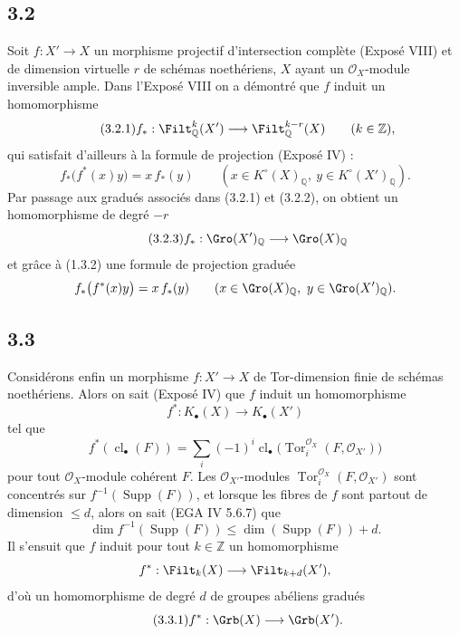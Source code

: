 \documentclass[11pt]{article}
\newcommand{\cl}{\operatorname{cl}}
\newcommand{\Tor}{\operatorname{Tor}}
\providecommand{\Tor}{\operatorname{Tor}}
\providecommand{\Supp}{\operatorname{Supp}}
\begin{document}
\subsection*{3.2}
Soit \(f:X'\to X\) un morphisme projectif d'intersection complète (Exposé VIII) et de dimension virtuelle \(r\) de schémas noethériens, \(X\) ayant un \(\mathcal O_X\)-module inversible ample. Dans l'Exposé VIII on a démontré que \(f\) induit un homomorphisme
\begin{equation}\tag{3.2.1}
 f_*:\Filt^k_{\mathbb Q}(X')\longrightarrow\Filt^{k-r}_{\mathbb Q}(X)\qquad(k\in\mathbb Z),
\end{equation}
qui satisfait d'ailleurs à la formule de projection (Exposé IV) :
\begin{equation}\tag{3.2.2}
 f_*\bigl(f^*(x)y\bigr)=x\,f_*(y)
 \qquad (x\in K^\circ(X)_{\mathbb Q},\ y\in K^\circ(X')_{\mathbb Q}).
\end{equation}
Par passage aux gradués associés dans (3.2.1) et (3.2.2), on obtient un homomorphisme de degré \(-r\)
\begin{equation}\tag{3.2.3}
 f_*:\Gro(X')_{\mathbb Q}\longrightarrow\Gro(X)_{\mathbb Q}
\end{equation}
et grâce à (1.3.2) une formule de projection graduée
\[
 f_*\bigl(f^*(x)y\bigr)=x\,f_*(y)
 \qquad (x\in\Gro(X)_{\mathbb Q},\ y\in\Gro(X')_{\mathbb Q}).
\]

\subsection*{3.3}
Considérons enfin un morphisme \(f:X'\to X\) de Tor-dimension finie de schémas noethériens. Alors on sait (Exposé IV) que \(f\) induit un homomorphisme
\[
 f^*:K_\bullet(X)\longrightarrow K_\bullet(X')
\]
tel que
\[
 f^*(\cl_\bullet(F))=
 \sum_i(-1)^i\cl_\bullet\bigl(\Tor_i^{\mathcal O_X}(F,\mathcal O_{X'})\bigr)
\]
pour tout \(\mathcal O_X\)-module cohérent \(F\). Les \(\mathcal O_{X'}\)-modules \(\Tor_i^{\mathcal O_X}(F,\mathcal O_{X'})\) sont concentrés sur \(f^{-1}(\Supp(F))\), et lorsque les fibres de \(f\) sont partout de dimension \(\leq d\), alors on sait (EGA IV 5.6.7) que
\[
 \dim f^{-1}(\Supp(F))\leq \dim(\Supp(F))+d.
\]
Il s'ensuit que \(f\) induit pour tout \(k\in\mathbb Z\) un homomorphisme
\[
 f^*:\Filt_k(X)\longrightarrow\Filt_{k+d}(X'),
\]
d'où un homomorphisme de degré \(d\) de groupes abéliens gradués
\begin{equation}\tag{3.3.1}
 f^*:\Grb(X)\longrightarrow\Grb(X').
\end{equation}
\end{document}
